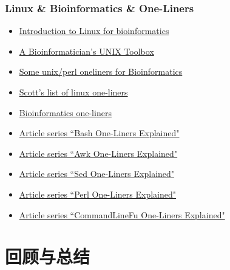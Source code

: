 \begin{frame}
  \frametitle{Linux \& Bioinformatics \& One-Liners}
  \begin{itemize}
    \item \href{http://wiki.bits.vib.be/index.php/Introduction\_to\_Linux\_for\_bioinformatics}{Introduction to Linux for bioinformatics}
    \item \href{http://lh3lh3.users.sourceforge.net/biounix.shtml}{A Bioinformatician's UNIX Toolbox}
    \item \href{http://genomics-array.blogspot.com/2010/11/some-unixperl-oneliners-for.html}{Some unix/perl oneliners for Bioinformatics}
    \item \href{https://wikis.utexas.edu/display/bioiteam/Scott's+list+of+linux+one-liners}{Scott's list of linux one-liners}
    \item \href{https://github.com/stephenturner/oneliners}{Bioinformatics one-liners}
    \item \href{http://www.catonmat.net/series/bash-one-liners-explained}{Article series ``Bash One-Liners Explained"}
    \item \href{http://www.catonmat.net/series/awk-one-liners-explained}{Article series ``Awk One-Liners Explained"}
    \item \href{http://www.catonmat.net/series/sed-one-liners-explained}{Article series ``Sed One-Liners Explained"}
    \item \href{http://www.catonmat.net/series/perl-one-liners-explained}{Article series ``Perl One-Liners Explained"}
    \item \href{http://www.catonmat.net/series/commandlinefu-one-liners-explained}{Article series ``CommandLineFu One-Liners Explained"}
  \end{itemize}
\end{frame}

\section{回顾与总结}
